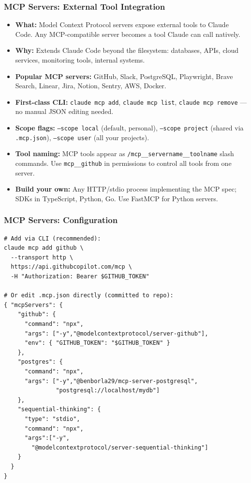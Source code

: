 \begin{frame}[fragile]\frametitle{MCP Servers: External Tool Integration}
  \begin{itemize}
    \item \textbf{What:} Model Context Protocol servers expose external tools to Claude Code. Any MCP-compatible server becomes a tool Claude can call natively.
    \item \textbf{Why:} Extends Claude Code beyond the filesystem: databases, APIs, cloud services, monitoring tools, internal systems.
    \item \textbf{Popular MCP servers:} GitHub, Slack, PostgreSQL, Playwright, Brave Search, Linear, Jira, Notion, Sentry, AWS, Docker.
    \item \textbf{First-class CLI:} \texttt{claude mcp add}, \texttt{claude mcp list}, \texttt{claude mcp remove} --- no manual JSON editing needed.
    \item \textbf{Scope flags:} \texttt{--scope local} (default, personal), \texttt{--scope project} (shared via \texttt{.mcp.json}), \texttt{--scope user} (all your projects).
    \item \textbf{Tool naming:} MCP tools appear as \texttt{/mcp\_\_servername\_\_toolname} slash commands. Use \texttt{mcp\_\_github} in permissions to control all tools from one server.
    \item \textbf{Build your own:} Any HTTP/stdio process implementing the MCP spec; SDKs in TypeScript, Python, Go. Use FastMCP for Python servers.
  \end{itemize}

\end{frame}

\begin{frame}[fragile]\frametitle{MCP Servers: Configuration}

\begin{lstlisting}
# Add via CLI (recommended):
claude mcp add github \
  --transport http \
  https://api.githubcopilot.com/mcp \
  -H "Authorization: Bearer $GITHUB_TOKEN"

# Or edit .mcp.json directly (committed to repo):
{ "mcpServers": {
    "github": {
      "command": "npx",
      "args": ["-y","@modelcontextprotocol/server-github"],
      "env": { "GITHUB_TOKEN": "$GITHUB_TOKEN" }
    },
    "postgres": {
      "command": "npx",
      "args": ["-y","@benborla29/mcp-server-postgresql",
               "postgresql://localhost/mydb"]
    },
    "sequential-thinking": {
      "type": "stdio",
      "command": "npx",
      "args":["-y",
        "@modelcontextprotocol/server-sequential-thinking"]
    }
  }
}
\end{lstlisting}
\end{frame}


